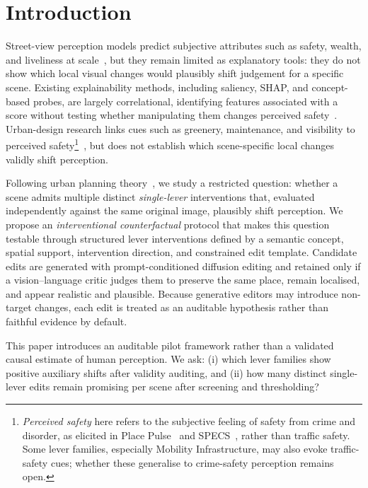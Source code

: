 \section{Introduction}
\label{sec:intro}

Street-view perception models predict subjective attributes such as safety, wealth, and liveliness at scale~\cite{salesses2013,naik2014,dubey2016}, but they remain limited as explanatory tools: they do not show which local visual changes would plausibly shift judgement for a specific scene. Existing explainability methods, including saliency, SHAP, and concept-based probes, are largely correlational, identifying features associated with a score without testing whether manipulating them changes perceived safety~\cite{adebayo2018,kim2018}. Urban-design research links cues such as greenery, maintenance, and visibility to perceived safety\footnote{\emph{Perceived safety} here refers to the subjective feeling of safety from crime and disorder, as elicited in Place Pulse~\cite{salesses2013} and SPECS~\cite{quintana2025}, rather than traffic safety. Some lever families, especially Mobility Infrastructure, may also evoke traffic-safety cues; whether these generalise to crime-safety perception remains open.}~\cite{li2015greenery,jiang2018brokenwindows,portnov2020lighting}, but does not establish which scene-specific local changes validly shift perception.

Following urban planning theory~\cite{jacobs1961,newman1972}, we study a restricted question: whether a scene admits multiple distinct \emph{single-lever} interventions that, evaluated independently against the same original image, plausibly shift perception. We propose an \emph{interventional counterfactual} protocol that makes this question testable through structured lever interventions defined by a semantic concept, spatial support, intervention direction, and constrained edit template. Candidate edits are generated with prompt-conditioned diffusion editing and retained only if a vision--language critic judges them to preserve the same place, remain localised, and appear realistic and plausible. Because generative editors may introduce non-target changes, each edit is treated as an auditable hypothesis rather than faithful evidence by default.

This paper introduces an auditable pilot framework rather than a validated causal estimate of human perception. We ask: (i) which lever families show positive auxiliary shifts after validity auditing, and (ii) how many distinct single-lever edits remain promising per scene after screening and thresholding?

